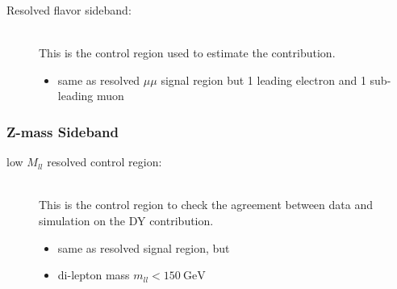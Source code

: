 \begin{description}
\item[Resolved flavor sideband:]\ \\  This is the control region used to estimate the \ttbar contribution.
  \begin{itemize}
  \item same as resolved $\mu\mu$ signal region but 1 leading electron and 1 sub-leading muon
  \end{itemize}
\end{description}

\subsubsection{Z-mass Sideband}

\begin{description}
\item[low $M_{ll}$ resolved control region:]\ \\ This is the control region to check the agreement between data and simulation on the DY contribution.
  \begin{itemize}
  \item same as resolved signal region, but
  \item di-lepton mass $m_{ll} < \SI{150}{\GeV}$
  \end{itemize}
\end{description}

